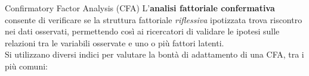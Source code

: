 \documentclass{beamer}
\begin{document}
\begin{frame}{Confirmatory Factor Analysis (CFA)}
    L'\textbf{analisi fattoriale confermativa} consente di verificare se la struttura fattoriale \textit{riflessiva} ipotizzata trova riscontro nei dati osservati, permettendo così ai ricercatori di validare le ipotesi sulle relazioni tra le variabili osservate e uno o più fattori latenti.\\
    \pause
    \vspace{1em}
    Si utilizzano diversi indici per valutare la bontà di adattamento di una CFA, tra i più comuni: \\
    \vspace{0.5em}
\end{frame}
\end{document}
